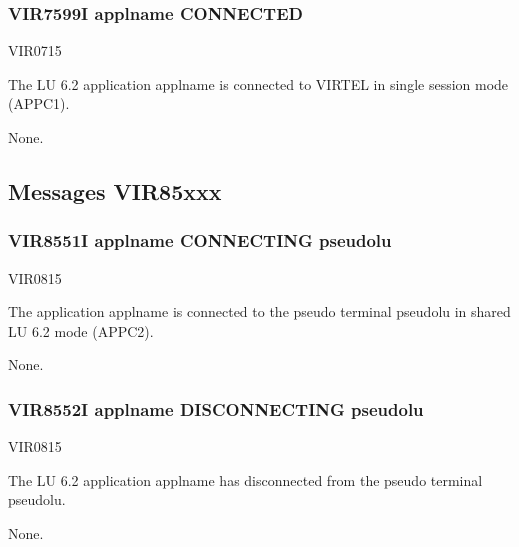 \documentclass[letterpaper,10pt,english]{sphinxmanual}
\begin{document}
\subsubsection{VIR7599I applname CONNECTED}
\label{\detokenize{messages:vir7599i-applname-connected}}\begin{description}
\sphinxAtStartPar
VIR0715

\sphinxAtStartPar
The LU 6.2 application applname is connected to VIRTEL in single session mode (APPC1).

\sphinxAtStartPar
None.

\end{description}


\subsection{Messages VIR85xxx}
\label{\detokenize{messages:messages-vir85xxx}}

\subsubsection{VIR8551I applname CONNECTING pseudolu}
\label{\detokenize{messages:vir8551i-applname-connecting-pseudolu}}\begin{description}
\sphinxAtStartPar
VIR0815

\sphinxAtStartPar
The application applname is connected to the pseudo terminal pseudolu in shared LU 6.2 mode (APPC2).

\sphinxAtStartPar
None.

\end{description}


\subsubsection{VIR8552I applname DISCONNECTING pseudolu}
\label{\detokenize{messages:vir8552i-applname-disconnecting-pseudolu}}\begin{description}
\sphinxAtStartPar
VIR0815

\sphinxAtStartPar
The LU 6.2 application applname has disconnected from the pseudo terminal pseudolu.

\sphinxAtStartPar
None.

\end{description}
\end{document}
